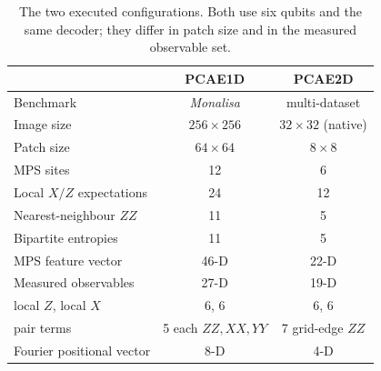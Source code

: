 \documentclass[pdflatex,sn-basic]{sn-jnl}
\begin{document}
\begin{table}[t]
	\centering
	\caption{The two executed configurations. Both use six qubits and the same
		decoder; they differ in patch size and in the measured observable set.}
	\label{tab:configurations}
	\begin{tabular}{@{}l c c@{}}
		\toprule
		& PCAE1D                 & PCAE2D                  \\
		\midrule
		Benchmark                     & \textit{Monalisa}     & multi-dataset          \\
		Image size                    & $256\times256$        & $32\times32$ (native)  \\
		Patch size                    & $64\times64$          & $8\times8$             \\
		MPS sites                     & 12                    & 6                      \\
		Local $X/Z$ expectations      & 24                    & 12                     \\
		Nearest-neighbour $ZZ$        & 11                    & 5                      \\
		Bipartite entropies           & 11                    & 5                      \\
		MPS feature vector            & 46-D                  & 22-D                   \\
		\midrule
		Measured observables          & 27-D                  & 19-D                   \\
		\quad local $Z$, local $X$    & 6, 6                  & 6, 6                   \\
		\quad pair terms              & 5 each $ZZ,XX,YY$     & 7 grid-edge $ZZ$       \\
		Fourier positional vector     & 8-D                   & 4-D                    \\
		\bottomrule
	\end{tabular}
\end{table}
\end{document}
